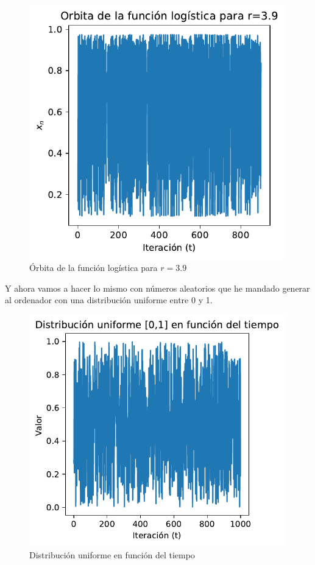\documentclass[
  10pt,
  a4paper,
  DIV=11,
  numbers=noendperiod,
  open=any]{scrreprt}
\numberwithin{equation}{chapter}
\numberwithin{equation}{section}
\renewcommand{\[}{\begin{equation}}
\renewcommand{\]}{\end{equation}}
\begin{document}
\begin{figure}[h]
  \centering
  \includegraphics[width=0.99\textwidth]{04-clima/atractor_files/figure-pdf/cell-2-output-1.pdf}
  \caption{Órbita de la función logística para $r=3.9$}
\end{figure}


Y ahora vamos a hacer lo mismo con números aleatorios que he mandado
generar al ordenador con una distribución uniforme entre 0 y 1.


\begin{figure}[h]
  \centering
  \includegraphics[width=0.99\textwidth]{04-clima/atractor_files/figure-pdf/cell-3-output-1.pdf}
  \caption{Distribución uniforme en función del tiempo}
\end{figure}
\end{document}
